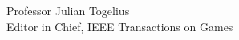 \documentclass[10pt]{letter} %
\begin{document}
\begin{letter}{Professor Julian Togelius \\ Editor in Chief, IEEE Transactions on Games}
\begin{enumerate}
\begin{itemize}
\begin{itemize}
			\end{itemize}
	
\end{itemize}
\end{enumerate}
 






\end{letter}
\end{document}

